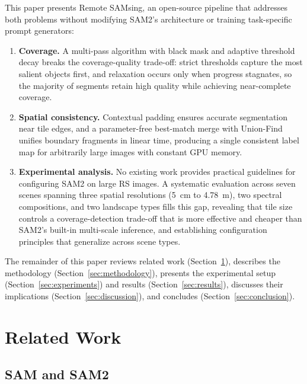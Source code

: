 \documentclass[review,11pt,authoryear]{elsarticle}
\begin{document}
This paper presents Remote SAMsing, an open-source pipeline that addresses both problems without modifying SAM2's architecture or training task-specific prompt generators:

\begin{enumerate}
    \item \textbf{Coverage.} A multi-pass algorithm with black mask and adaptive threshold decay breaks the coverage-quality trade-off: strict thresholds capture the most salient objects first, and relaxation occurs only when progress stagnates, so the majority of segments retain high quality while achieving near-complete coverage.
    \item \textbf{Spatial consistency.} Contextual padding ensures accurate segmentation near tile edges, and a parameter-free best-match merge with Union-Find unifies boundary fragments in linear time, producing a single consistent label map for arbitrarily large images with constant GPU memory.
    \item \textbf{Experimental analysis.} No existing work provides practical guidelines for configuring SAM2 on large RS images. A systematic evaluation across seven scenes spanning three spatial resolutions (5~cm to 4.78~m), two spectral compositions, and two landscape types fills this gap, revealing that tile size controls a coverage-detection trade-off that is more effective and cheaper than SAM2's built-in multi-scale inference, and establishing configuration principles that generalize across scene types.
\end{enumerate}

The remainder of this paper reviews related work (Section~\ref{sec:related}), describes the methodology (Section~\ref{sec:methodology}), presents the experimental setup (Section~\ref{sec:experiments}) and results (Section~\ref{sec:results}), discusses their implications (Section~\ref{sec:discussion}), and concludes (Section~\ref{sec:conclusion}).


\section{Related Work}
\label{sec:related}

\subsection{SAM and SAM2}
\label{sec:related_sam}
\end{document}
